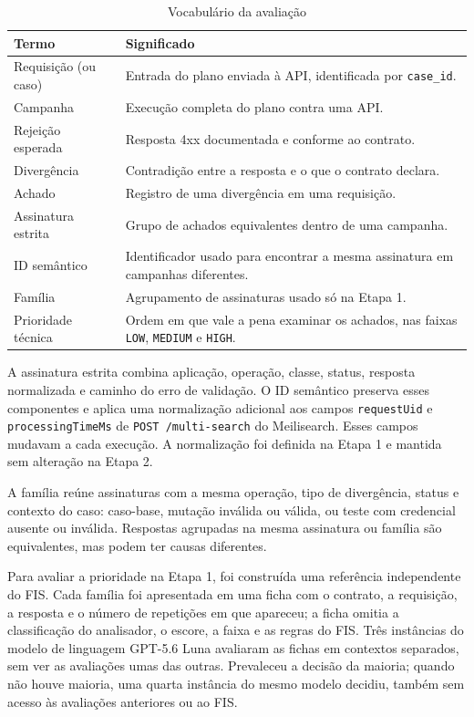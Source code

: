 \begin{table}[H]
\centering
\caption{Vocabulário da avaliação}
\label{tab:vocabulario}
\small
\begin{tabular}{|>{\raggedright\arraybackslash}p{3.7cm}|>{\raggedright\arraybackslash}p{9.9cm}|}
\hline
\textbf{Termo} & \textbf{Significado} \\ \hline
Requisição (ou caso) & Entrada do plano enviada à API, identificada por \texttt{case\_id}. \\ \hline
Campanha & Execução completa do plano contra uma API. \\ \hline
Rejeição esperada & Resposta 4xx documentada e conforme ao contrato. \\ \hline
Divergência & Contradição entre a resposta e o que o contrato declara. \\ \hline
Achado & Registro de uma divergência em uma requisição. \\ \hline
Assinatura estrita & Grupo de achados equivalentes dentro de uma campanha. \\ \hline
ID semântico & Identificador usado para encontrar a mesma assinatura em campanhas diferentes. \\ \hline
Família & Agrupamento de assinaturas usado só na Etapa 1. \\ \hline
Prioridade técnica & Ordem em que vale a pena examinar os achados, nas faixas \texttt{LOW}, \texttt{MEDIUM} e \texttt{HIGH}. \\ \hline
\end{tabular}
\end{table}

A assinatura estrita combina aplicação, operação, classe, status, resposta
normalizada e caminho do erro de validação. O ID semântico preserva esses
componentes e aplica uma normalização adicional aos campos \texttt{requestUid}
e \texttt{processingTimeMs} de \texttt{POST /multi-search} do Meilisearch.
Esses campos mudavam a cada execução. A normalização foi definida na Etapa 1
e mantida sem alteração na Etapa 2.

A família reúne assinaturas com a mesma operação, tipo de divergência, status
e contexto do caso: caso-base, mutação inválida ou válida, ou teste com
credencial ausente ou inválida. Respostas agrupadas na mesma assinatura ou
família são equivalentes, mas podem ter causas diferentes.

Para avaliar a prioridade na Etapa 1, foi construída uma referência
independente do FIS. Cada família foi apresentada em uma ficha com o contrato,
a requisição, a resposta e o número de repetições em que apareceu; a ficha
omitia a classificação do analisador, o escore, a faixa e as regras do FIS.
Três instâncias do modelo de linguagem GPT-5.6 Luna avaliaram as fichas em
contextos separados, sem ver as avaliações umas das outras. Prevaleceu a
decisão da maioria; quando não houve maioria, uma quarta instância do mesmo
modelo decidiu, também sem acesso às avaliações anteriores ou ao FIS.

